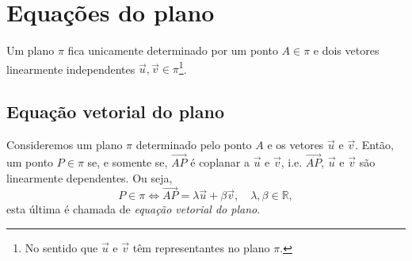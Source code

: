 \section{Equações do plano}\label{cap_erp_sec_eqsplano}

Um plano $\pi$ fica unicamente determinado por um ponto $A\in \pi$ e dois vetores linearmente independentes $\vec{u},\vec{v}\in \pi$\footnote{No sentido que $\vec{u}$ e $\vec{v}$ têm representantes no plano $\pi$.}.

\subsection{Equação vetorial do plano}

Consideremos um plano $\pi$ determinado pelo ponto $A$ e os vetores $\vec{u}$ e $\vec{v}$. Então, um ponto $P\in \pi$ se, e somente se, $\overrightarrow{AP}$ é coplanar a $\vec{u}$ e $\vec{v}$, i.e. $\overrightarrow{AP}$, $\vec{u}$ e $\vec{v}$ são linearmente dependentes. Ou seja,
\begin{equation}
  P\in\pi \Leftrightarrow \overrightarrow{AP} = \lambda\vec{u}+\beta\vec{v},\quad\lambda,\beta\in\mathbb{R},
\end{equation}
esta última é chamada de \emph{equação vetorial do plano}.

